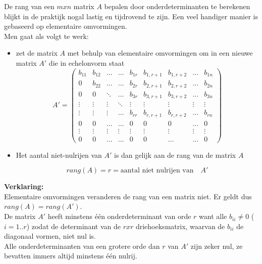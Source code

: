 \begin{itemize}
De rang van een $mxn$ matrix $A$ bepalen door onderdeterminanten te berekenen blijkt in de praktijk nogal lastig en tijdrovend te zijn. Een veel handiger manier is gebaseerd op elementaire omvormingen.\\

Men gaat als volgt te werk:

\begin{itemize}
	\item zet de matrix $A$ met behulp van elementaire omvormingen om in een nieuwe matrix $A'$ die in echelonvorm staat\\
	
	\[ A'= \left( \begin{matrix}
	b_{11} & b_{12} & \ldots & \ldots & b_{1r} & b_{1,r+1} & b_{1,r+2} & \ldots & b_{1n} \\
	0 & b_{22} & \ldots & \ldots & b_{2r} & b_{2,r+1} & b_{2,r+2} & \ldots & b_{2n} \\
	0 & 0 & \ddots & \ldots & b_{3r} & b_{3,r+1} & b_{3,r+2} & \ldots & b_{3n} \\
	\vdots & \vdots & \vdots & \ddots & \vdots & \vdots & \vdots & \vdots & \vdots \\
	\vdots & \vdots & \vdots & \ldots & b_{rr} & b_{r,r+1} & b_{r,r+2} & \ldots & b_{rn} \\
	0 & 0 & \ldots & \ldots & 0 & 0 & 0 & \ldots & 0\\
	\vdots & \vdots & \vdots & \vdots & \vdots & \vdots & \vdots & \vdots & \vdots \\
	0 & 0 & \ldots & \ldots & 0 & 0 & \ldots & \ldots & 0
	\end{matrix} \right) \]
	
	\item Het aantal niet-nulrijen van $A'$ is dan gelijk aan de rang van de matrix $A$
	
	\begin{framed}
		\[ rang(A)=r=\textrm{aantal niet nulrijen van} \quad A'  \]
	\end{framed}
\end{itemize}

\end{itemize}

{\bf Verklaring:}\\

Elementaire omvormingen veranderen de rang van een matrix niet. Er geldt dus $rang(A)=rang(A')$.\\
De matrix $A'$ heeft minstens \'{e}\'{e}n onderdeterminant van orde $r$ want alle $b_{ii} \neq 0$ ($i=1..r$) zodat de determinant van de $rxr$ driehoeksmatrix, waarvan de $b_{ii}$ de diagonaal vormen, niet nul is.\\
Alle onderdeterminanten van een grotere orde dan $r$ van $A'$ zijn zeker nul, ze bevatten immers altijd minstens \'{e}\'{e}n nulrij.\\  

